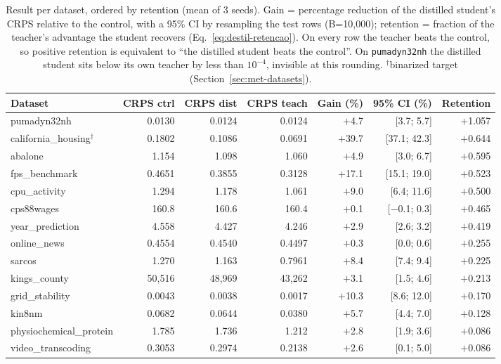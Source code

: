 \begin{table}[htbp]
\centering
\caption[Distributional distillation result per dataset]{Result per
dataset, ordered by retention (mean of 3 seeds). Gain = percentage
reduction of the distilled student's CRPS relative to the control,
with a 95\% CI by resampling the test rows (B=10{,}000); retention =
fraction of the teacher's advantage the student recovers
(Eq.~\ref{eq:destil-retencao}). On every row the teacher beats the
control, so positive retention is equivalent to ``the distilled
student beats the control''. On \texttt{pumadyn32nh} the distilled
student sits below its own teacher by less than $10^{-4}$, invisible
at this rounding. $^\dagger$binarized target
(Section~\ref{sec:met-datasets}).}
\label{tab:destil-retencao}
\scriptsize
\setlength{\tabcolsep}{4pt}
\begin{tabular}{lrrrrrr}
\toprule
Dataset & CRPS ctrl & CRPS dist & CRPS teach & Gain (\%) & 95\% CI (\%) & Retention \\
\midrule
pumadyn32nh & 0.0130 & 0.0124 & 0.0124 & $+$4.7 & [3.7; 5.7] & $+$1.057 \\
california\_housing$^\dagger$ & 0.1802 & 0.1086 & 0.0691 & $+$39.7 & [37.1; 42.3] & $+$0.644 \\
abalone & 1.154 & 1.098 & 1.060 & $+$4.9 & [3.0; 6.7] & $+$0.595 \\
fps\_benchmark & 0.4651 & 0.3855 & 0.3128 & $+$17.1 & [15.1; 19.0] & $+$0.523 \\
cpu\_activity & 1.294 & 1.178 & 1.061 & $+$9.0 & [6.4; 11.6] & $+$0.500 \\
cps88wages & 160.8 & 160.6 & 160.4 & $+$0.1 & [$-$0.1; 0.3] & $+$0.465 \\
year\_prediction & 4.558 & 4.427 & 4.246 & $+$2.9 & [2.6; 3.2] & $+$0.419 \\
online\_news & 0.4554 & 0.4540 & 0.4497 & $+$0.3 & [0.0; 0.6] & $+$0.255 \\
sarcos & 1.270 & 1.163 & 0.7961 & $+$8.4 & [7.4; 9.4] & $+$0.225 \\
kings\_county & 50{,}516 & 48{,}969 & 43{,}262 & $+$3.1 & [1.5; 4.6] & $+$0.213 \\
grid\_stability & 0.0043 & 0.0038 & 0.0017 & $+$10.3 & [8.6; 12.0] & $+$0.170 \\
kin8nm & 0.0682 & 0.0644 & 0.0380 & $+$5.7 & [4.4; 7.0] & $+$0.128 \\
physiochemical\_protein & 1.785 & 1.736 & 1.212 & $+$2.8 & [1.9; 3.6] & $+$0.086 \\
video\_transcoding & 0.3053 & 0.2974 & 0.2138 & $+$2.6 & [0.1; 5.0] & $+$0.086 \\

\end{tabular}
\end{table}
